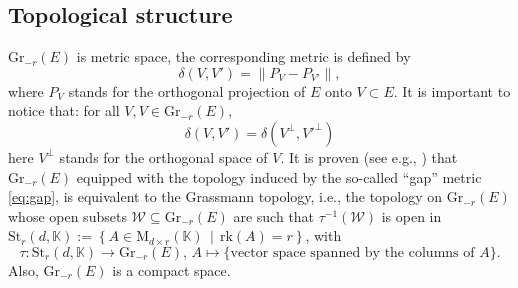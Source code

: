 \documentclass[10pt]{article}
\theoremstyle{plain}
\theoremstyle{definition}
\theoremstyle{remark}
\begin{document}
 \subsection{Topological structure} $\mathrm{Gr}_{-r}(E)$ is metric space, the corresponding metric is defined by \begin{equation}\label{eq:gap}
     {\displaystyle \delta(V,V')=\lVert {P}_{V}-{P}_{V'}\rVert,}
 \end{equation} where  ${P}_V$ stands for the orthogonal projection of $E$ onto $V\subset E$. It is important to notice that: for all $V, V\in\mathrm{Gr}_{-r}(E)$,\;\begin{equation*}
        \delta(V,V')= \delta(V^\perp,{V'}^\perp)
    \end{equation*} here $V^\perp$ stands for the orthogonal space of $V$. It is proven  (see e.g., \cite{FERRER1994229}) that $\mathrm{Gr}_{-r}(E)$ equipped with the topology induced by the so-called “gap” metric \eqref{eq:gap}, is equivalent to the Grassmann topology, i.e., the topology on $\mathrm{Gr}_{-r}(E)$ whose open subsets $\mathcal{W}\subseteq{\mathrm{Gr}_{-r}(E)}$ are such that $\tau^{-1}(\mathcal{W})$ is open in $\mathrm{St}_r(d, \mathbb{K}):=\left\{A\in\mathrm{M}_{d\times r}(\mathbb{K})\,  \middle|\, \mathrm{rk}(A)=r  \right\}$, with $$\tau\colon \mathrm{St}_r(d, \mathbb{K})\longrightarrow\mathrm{Gr}_{-r}(E),\, A\longmapsto \{\text{vector space spanned by the columns of $A$}\}.$$ 
 Also, $\mathrm{Gr}_{-r}(E)$ is a compact space. 
\end{document}
